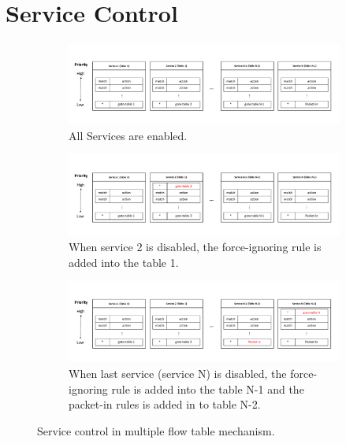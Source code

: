 \section{Service Control} \label{sec:service_control}

\begin{figure}[!tp]
  \begin{subfigure}[b]{\textwidth}
    \includegraphics[width=\textwidth]{./fig/service_control1.pdf}
    \caption{All Services are enabled.}
    \label{fig:service_control_all_enable}
  \end{subfigure}
  \hfill
  \begin{subfigure}[b]{\textwidth}
    \includegraphics[width=\textwidth]{./fig/service_control2.pdf}
    \caption{When service 2 is disabled, the force-ignoring rule is added into the table 1.}
    \label{fig:service_control_disable2}
  \end{subfigure}
  \hfill
  \begin{subfigure}[b]{\textwidth}
    \includegraphics[width=\textwidth]{./fig/service_control3.pdf}
    \caption{When last service (service N) is disabled, the force-ignoring rule is added into the table N-1 and the packet-in rules is added in to table N-2.}
    \label{fig:service_control_last}
  \end{subfigure}
  \caption{Service control in multiple flow table mechanism.}
\end{figure}


